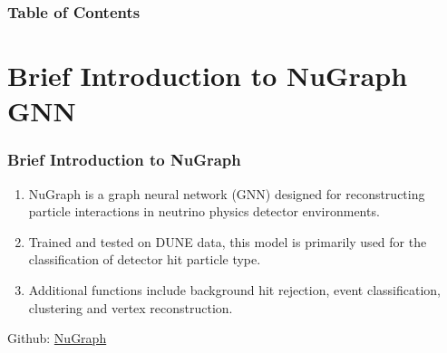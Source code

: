\documentclass{beamer}
\title{\subtitle{Binary Classification Model for Decay Events}}
\author{Murdock Aubry, Prince Bhaura, Yijie Wang}
\institute{University of Toronto}
\date{\today}
\begin{document}
\frame{\titlepage}

\begin{frame}
	\frametitle{Table of Contents}
	\tableofcontents
\end{frame}





\section{Brief Introduction to NuGraph GNN}

\begin{frame}
	\frametitle{Brief Introduction to NuGraph}
		\begin{enumerate} 
			\item NuGraph is a graph neural network (GNN) designed for reconstructing particle interactions in neutrino physics detector environments.

			\item Trained and tested on DUNE data, this model is primarily used for the classification of detector hit particle type.

   			\item Additional functions include background hit rejection, event classification, clustering and vertex reconstruction.
		\end{enumerate}

		\centering
		\vspace{\fill}
		Github: \href{https://github.com/exatrkx/NuGraph/tree/main}{\color{blue} NuGraph}
\end{frame}



\end{document}
